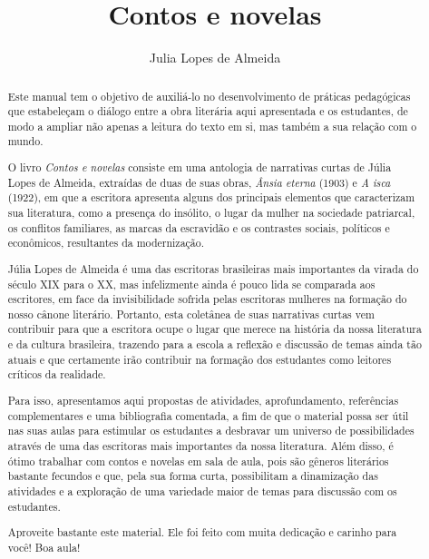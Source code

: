 \documentclass[12pt]{extarticle}
\begin{document}
\newcommand{\AutorLivro}{Julia Lopes de Almeida}
\newcommand{\TituloLivro}{Contos e novelas}
\newcommand{\Tema}{Ficção, mistério e fantasia}
\newcommand{\Genero}{Conto, crônica e novela}
\newcommand{\imagemCapa}{./images/PNLD0002-01.png}
\newcommand{\issnppub}{---}
\newcommand{\issnepub}{---}
\newcommand{\colaborador}{Rodrigo Jorge Ribeiro Neves}


\title{\TituloLivro}
\author{\AutorLivro}
\def\authornotes{\colaborador}

\date{}
\maketitle



\begin{abstract}
Este manual tem o objetivo de auxiliá-lo no desenvolvimento de práticas
pedagógicas que estabeleçam o diálogo entre a obra literária aqui
apresentada e os estudantes, de modo a ampliar não apenas a leitura do
texto em si, mas também a sua relação com o mundo.

O livro \emph{Contos e novelas} consiste em uma antologia de narrativas
curtas de Júlia Lopes de Almeida, extraídas de duas de suas obras,
\emph{Ânsia eterna} (1903) e \emph{A isca} (1922), em que a escritora
apresenta alguns dos principais elementos que caracterizam sua
literatura, como a presença do insólito, o lugar da mulher na sociedade
patriarcal, os conflitos familiares, as marcas da escravidão e os
contrastes sociais, políticos e econômicos, resultantes da modernização.

Júlia Lopes de Almeida é uma das escritoras brasileiras mais importantes
da virada do século \textsc{XIX} para o \textsc{XX}, mas infelizmente ainda é pouco lida
se comparada aos escritores, em face da invisibilidade sofrida pelas
escritoras mulheres na formação do nosso cânone literário. Portanto,
esta coletânea de suas narrativas curtas vem contribuir para que a
escritora ocupe o lugar que merece na história da nossa literatura e da
cultura brasileira, trazendo para a escola a reflexão e discussão de
temas ainda tão atuais e que certamente irão contribuir na formação dos
estudantes como leitores críticos da realidade.

Para isso, apresentamos aqui propostas de atividades, aprofundamento,
referências complementares e uma bibliografia comentada, a fim de que o
material possa ser útil nas suas aulas para estimular os estudantes a
desbravar um universo de possibilidades através de uma das escritoras
mais importantes da nossa literatura. Além disso, é ótimo trabalhar com
contos e novelas em sala de aula, pois são gêneros literários bastante
fecundos e que, pela sua forma curta, possibilitam a dinamização das
atividades e a exploração de uma variedade maior de temas para discussão
com os estudantes.

Aproveite bastante este material. Ele foi feito com muita dedicação e
carinho para você! Boa aula!
\end{abstract}
\end{document}
